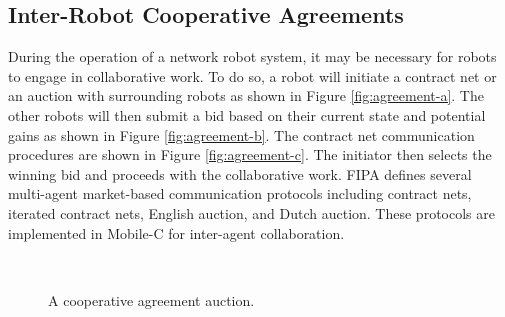   \subsection{Inter-Robot Cooperative Agreements}
    During the operation of a network robot system, it may be necessary for 
      robots to engage in collaborative work.
    To do so, a robot will initiate a contract net or an auction with 
      surrounding robots as shown in Figure \ref{fig:agreement-a}.
    The other robots will then submit a bid based on their current state and 
      potential gains as shown in Figure \ref{fig:agreement-b}.
    The contract net communication procedures are shown in Figure 
      \ref{fig:agreement-c}.
    The initiator then selects the winning bid and proceeds with the 
      collaborative work.
    FIPA defines several multi-agent market-based communication protocols 
      including contract nets, iterated contract nets, English auction, and 
      Dutch auction.
    These protocols are implemented in Mobile-C for inter-agent collaboration.
    \begin{figure}%
    \begin{center}
      \hspace{1in}
      \\
    \end{center}
    \caption{A cooperative agreement auction.}
    \label{fig:agreement}
    \end{figure}

